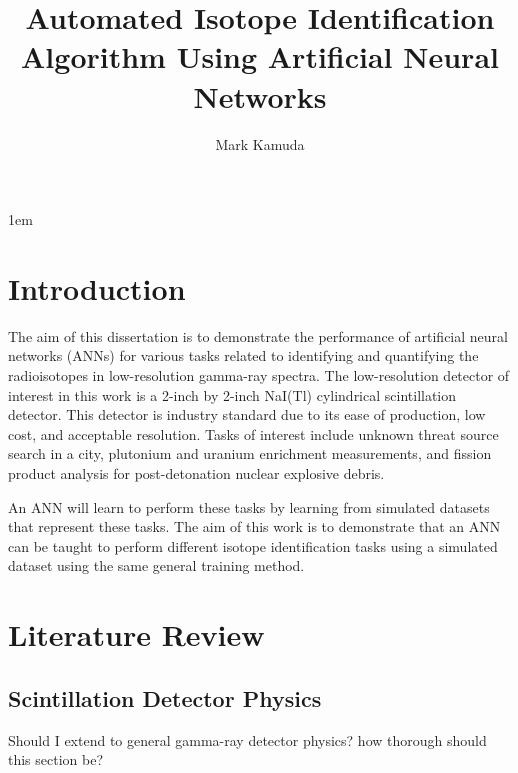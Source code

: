 \documentclass[thesis,tocnosub,noragright,centerchapter,12pt,fullpage]{uiucecethesis09}
\title{Automated Isotope Identification Algorithm Using Artificial Neural Networks}
\author{Mark Kamuda}
\begin{document}
%

%
\maketitle

\parindent 1em%

\frontmatter

\tableofcontents

\listoftables

\listoffigures

\mainmatter


\chapter{Introduction}

The aim of this dissertation is to demonstrate the performance of artificial neural networks (ANNs) for various tasks related to identifying and quantifying the radioisotopes in low-resolution gamma-ray spectra. The low-resolution detector of interest in this work is a 2-inch by 2-inch NaI(Tl) cylindrical scintillation detector. This detector is industry standard due to its ease of production, low cost, and acceptable resolution. Tasks of interest include unknown threat source search in a city, plutonium and uranium enrichment measurements, and fission product analysis for post-detonation nuclear explosive debris. 

An ANN will learn to perform these tasks by learning from simulated datasets that represent these tasks. The aim of this work is to demonstrate that an ANN can be taught to perform different isotope identification tasks using a simulated dataset using the same general training method.


\chapter{Literature Review}


\section{Scintillation Detector Physics}

Should I extend to general gamma-ray detector physics? how thorough should this section be?
\end{document}

